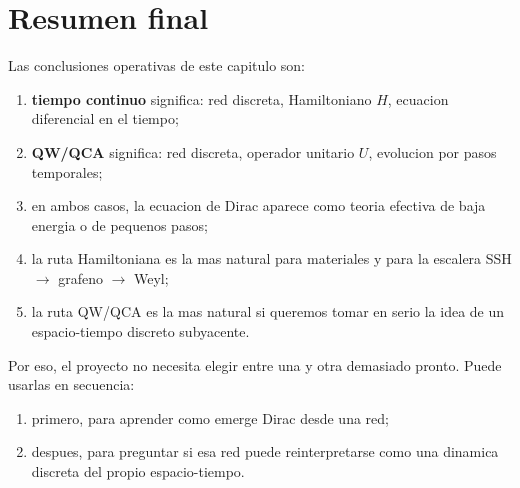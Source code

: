 \section{Resumen final}

Las conclusiones operativas de este capitulo son:

\begin{enumerate}[leftmargin=*]
  \item \textbf{tiempo continuo} significa: red discreta, Hamiltoniano \(H\), ecuacion diferencial en el tiempo;
  \item \textbf{QW/QCA} significa: red discreta, operador unitario \(U\), evolucion por pasos temporales;
  \item en ambos casos, la ecuacion de Dirac aparece como teoria efectiva de baja energia o de pequenos pasos;
  \item la ruta Hamiltoniana es la mas natural para materiales y para la escalera SSH \(\to\) grafeno \(\to\) Weyl;
  \item la ruta QW/QCA es la mas natural si queremos tomar en serio la idea de un espacio-tiempo discreto subyacente.
\end{enumerate}

Por eso, el proyecto no necesita elegir entre una y otra demasiado pronto. Puede usarlas en secuencia:

\begin{enumerate}[leftmargin=*]
  \item primero, para aprender como emerge Dirac desde una red;
  \item despues, para preguntar si esa red puede reinterpretarse como una dinamica discreta del propio espacio-tiempo.
\end{enumerate}

